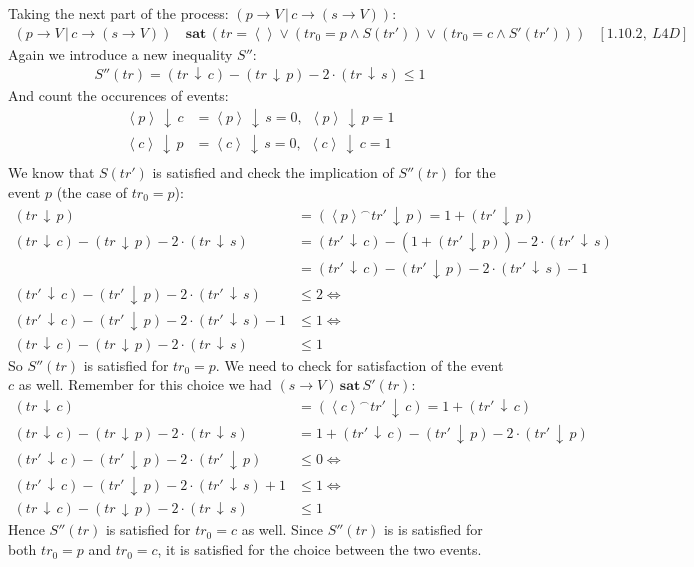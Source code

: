 \documentclass[11pt,a4paper]{article}
\def\ra{\rightarrow}
\def\ch{\,|\,}
\def\cat{^{\frown}}
\def\count{\,\downarrow\,}
\def\sat{\,\textbf{sat}\,}
\newcommand{\ab}[1]{\left \langle #1 \right \rangle}
\begin{document}
Taking the next part of the process: $(p \ra V \ch c \ra (s \ra V))$:
\begin{align*}
    (p \ra V \ch c \ra (s \ra V)) &\sat (
        tr = \ab{ } \lor
        (tr_0 = p \land S(tr')) \lor
        (tr_0 = c \land S'(tr'))
        ) & [1.10.2,~L4D]
\end{align*}
Again we introduce a new inequality $S''$:
\begin{align*}
    S''(tr) = (tr \count c) - (tr \count p) - 2 \cdot (tr \count s) \leq 1 
\end{align*}
And count the occurences of events:
\begin{align*}
        \ab{p} \count c &= \ab{p} \count s = 0,~~ \ab{p} \count p = 1 \\
        \ab{c} \count p &= \ab{c} \count s = 0,~~ \ab{c} \count c = 1 \\
\end{align*}
We know that $S(tr')$ is satisfied and check the implication of $S''(tr)$ for the event $p$ (the case of $tr_0 = p$):
\begin{align*}
        (tr \count p) &= (\ab{p} \cat tr' \count p) = 1 + (tr' \count p) \\
    (tr \count c) - (tr \count p) - 2 \cdot (tr \count s) &=
        (tr' \count c) - (1+(tr' \count p)) - 2 \cdot (tr' \count s) \\
        &= (tr' \count c) - (tr' \count p) - 2 \cdot (tr' \count s) -1 \\
(tr' \count c) - (tr' \count p) - 2 \cdot (tr' \count s) &\leq 2 \Leftrightarrow
\\
        (tr' \count c) - (tr' \count p) - 2 \cdot (tr' \count s) -1 &\leq 1
        \Leftrightarrow \\
        (tr \count c) - (tr \count p) - 2 \cdot (tr \count s) &\leq 1
\end{align*}
So $S''(tr)$ is satisfied for $tr_0 = p$. We need to check for satisfaction of the event $c$ as
well. Remember for this choice we had $(s \ra V) \sat S'(tr)$:
\begin{align*}
    (tr \count c) &= (\ab{c} \cat tr' \count c) = 1 + (tr' \count c) \\
    (tr \count c) - (tr \count p) - 2 \cdot (tr \count s) &=
        1 + (tr' \count c) - (tr' \count p) - 2 \cdot (tr' \count p) \\
    (tr' \count c) - (tr' \count p) - 2 \cdot (tr' \count p) &\leq 0
    \Leftrightarrow \\
    (tr' \count c) - (tr' \count p) - 2 \cdot (tr' \count s) +1 &\leq 1
    \Leftrightarrow \\
    (tr \count c) - (tr \count p) - 2 \cdot (tr \count s) &\leq 1
\end{align*}
Hence $S''(tr)$ is satisfied for $tr_0 = c$ as well. Since $S''(tr)$ is is
satisfied for both $tr_0 = p$ and $tr_0 = c$, it is satisfied for the choice
between the two events.
\end{document}
